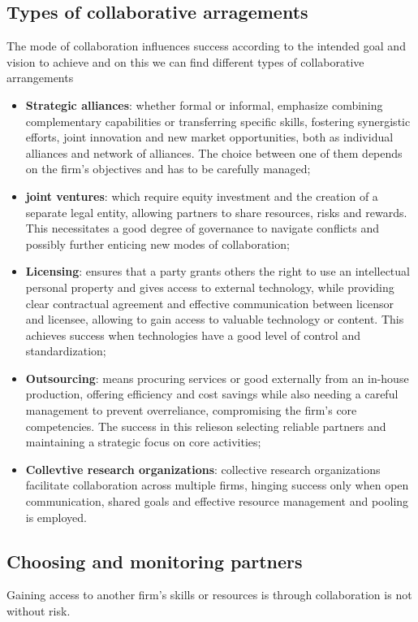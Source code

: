 \documentclass[12pt]{article}
\begin{document}
\subsection{Types of collaborative arragements}
The mode of collaboration influences success according to the intended goal and vision to achieve and on this we can find different types of collaborative arrangements
\begin{itemize}
    \item \textbf{Strategic alliances}: whether formal or informal, emphasize combining complementary capabilities or transferring specific skills, fostering synergistic efforts, joint innovation and new market opportunities, both as individual alliances and network of alliances. The choice between one of them depends on the firm’s objectives and has to be carefully managed;
    \item \textbf{joint ventures}:  which require equity investment and the creation of a separate legal entity, allowing partners to share resources, risks and rewards. This necessitates a good degree of governance to navigate conflicts and possibly further enticing new modes of collaboration;
    \item \textbf{Licensing}: ensures that a party grants others the right to use an intellectual personal property and gives access to external technology, while providing clear contractual agreement and effective communication between licensor and licensee, allowing to gain access to valuable technology or content. This achieves success when technologies have a good level of control and standardization;
    \item \textbf{Outsourcing}: means procuring services or good externally from an in-house production, offering efficiency and cost savings while also needing a careful management to prevent overreliance, compromising the firm’s core competencies. The success in this relieson selecting reliable partners and maintaining a strategic focus on core activities;
    \item \textbf{Collevtive research organizations}: collective research organizations facilitate collaboration across multiple firms, hinging success only when open communication, shared goals and effective resource management and pooling is employed.
\end{itemize}

\subsection{Choosing and monitoring partners}
Gaining access to another firm's skills or resources is through collaboration is not without risk.
\end{document}
